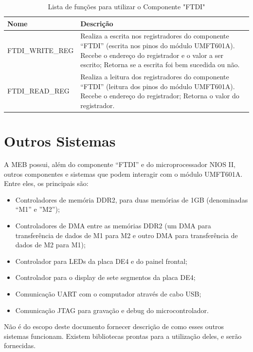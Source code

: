   \begin{table}[htpb]
  	\centering
  	\begin{tabularx}{\textwidth}{p{4.2cm} X}
  		\centering\arraybackslash\textbf{Nome} & \centering\arraybackslash\textbf{Descrição} \\ \hline
          FTDI\_WRITE\_REG & Realiza a escrita nos registradores do componente “FTDI” (escrita nos pinos do módulo UMFT601A). Recebe o endereço do registrador e o valor a ser escrito; Retorna se a escrita foi bem sucedida ou não.\\
          FTDI\_READ\_REG & Realiza a leitura dos registradores do componente “FTDI” (leitura dos pinos do módulo UMFT601A). Recebe o endereço do registrador; Retorna o valor do registrador.\\
  	\end{tabularx}
  	\caption{Lista de funções para utilizar o Componente "FTDI"{}}
  	\label{tab:list_ftdi}
  \end{table}
  
  
 
\chapter{Outros Sistemas}
  A MEB possui, além do componente “FTDI” e do microprocessador NIOS II, outros componentes e sistemas que podem interagir com o módulo UMFT601A. Entre eles, os principais são:
  \begin{itemize}
  	\item  Controladores de memória DDR2, para duas memórias de 1GB (denominadas “M1” e ”M2”);
  	\item  Controladores de DMA entre as memórias DDR2 (um DMA para transferência de dados de M1 para M2 e outro DMA para transferência de dados de M2 para M1);
  	\item  Controlador para LEDs da placa DE4 e do painel frontal;
  	\item  Controlador para o display de sete segmentos da placa DE4;
  	\item  Comunicação UART com o computador através de cabo USB;
  	\item  Comunicação JTAG para gravação e debug do microcontrolador.
  \end{itemize}
  \medskip
  Não é do escopo deste documento fornecer descrição de como esses outros sistemas funcionam. Existem bibliotecas prontas para a utilização deles, e serão fornecidas.

